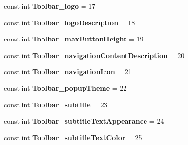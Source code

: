 \begin{DoxyCompactItemize}
const int {\bfseries Toolbar\+\_\+logo} = 17
\item 
\mbox{\label{classst_delivery_1_1_resource_1_1_styleable_acd44ec7846b27a8cfd76efb28a187ed1}} 
const int {\bfseries Toolbar\+\_\+logo\+Description} = 18
\item 
\mbox{\label{classst_delivery_1_1_resource_1_1_styleable_a2ec983b3b64318a52579e0460fad0f90}} 
const int {\bfseries Toolbar\+\_\+max\+Button\+Height} = 19
\item 
\mbox{\label{classst_delivery_1_1_resource_1_1_styleable_a09844cbfb45411db748546119eea1995}} 
const int {\bfseries Toolbar\+\_\+navigation\+Content\+Description} = 20
\item 
\mbox{\label{classst_delivery_1_1_resource_1_1_styleable_a813e9fbebc5df4ac3f671eb667c3c7f9}} 
const int {\bfseries Toolbar\+\_\+navigation\+Icon} = 21
\item 
\mbox{\label{classst_delivery_1_1_resource_1_1_styleable_ad8dc49d3b90efc4c74c26d708f820ab8}} 
const int {\bfseries Toolbar\+\_\+popup\+Theme} = 22
\item 
\mbox{\label{classst_delivery_1_1_resource_1_1_styleable_ac7274c5a525a34645ed3c8a14fa81756}} 
const int {\bfseries Toolbar\+\_\+subtitle} = 23
\item 
\mbox{\label{classst_delivery_1_1_resource_1_1_styleable_a28890cad16687c8ca7c5d4a5263eb616}} 
const int {\bfseries Toolbar\+\_\+subtitle\+Text\+Appearance} = 24
\item 
\mbox{\label{classst_delivery_1_1_resource_1_1_styleable_a6994497d3ec4b300bdaeecaf55e62fc7}} 
const int {\bfseries Toolbar\+\_\+subtitle\+Text\+Color} = 25
\item 
\mbox{\label{classst_delivery_1_1_resource_1_1_styleable_a1c6ead3b2092a6c35c9739c0e22c601a}} 

\end{DoxyCompactItemize}
